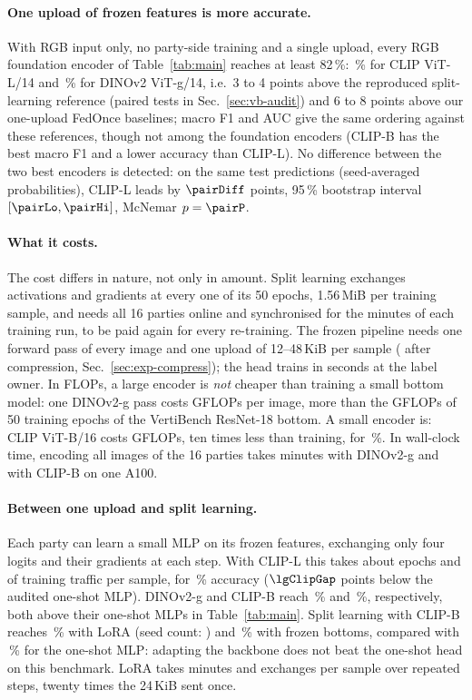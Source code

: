 \paragraph{One upload of frozen features is more accurate.}
With RGB input only, no party-side training and a single upload, every RGB foundation encoder of Table~\ref{tab:main} reaches at least 82\,\%: \vbClipAcc\,\% for CLIP ViT-L/14 and \vbGAcc\,\% for DINOv2 ViT-g/14, i.e.\ 3 to 4 points above the reproduced split-learning reference (paired tests in Sec.~\ref{sec:vb-audit}) and 6 to 8 points above our one-upload FedOnce baselines; macro F1 and AUC give the same ordering against these references, though not among the foundation encoders (CLIP-B has the best macro F1 and a lower accuracy than CLIP-L). No difference between the two best encoders is detected: on the same test predictions (seed-averaged probabilities), CLIP-L leads by $\pairDiff$ points, 95\,\% bootstrap interval $[\pairLo, \pairHi]$, McNemar $p=\pairP$.

\paragraph{What it costs.}
The cost differs in nature, not only in amount. Split learning exchanges activations and gradients at every one of its 50 epochs, 1.56\,MiB per training sample, and needs all 16 parties online and synchronised for the \reproMin{} minutes of each training run, to be paid again for every re-training. The frozen pipeline needs one forward pass of every image and one upload of 12--48\,KiB per sample (\selTwoBytes{} after compression, Sec.~\ref{sec:exp-compress}); the head trains in seconds at the label owner. In FLOPs, a large encoder is \emph{not} cheaper than training a small bottom model: one DINOv2-g pass costs \vbGGF{} GFLOPs per image, more than the \rEighteenTrainGF{} GFLOPs of 50 training epochs of the VertiBench ResNet-18 bottom. A small encoder is: CLIP ViT-B/16 costs \vbClipBGF{} GFLOPs, ten times less than training, for \vbClipBAcc\,\%. In wall-clock time, encoding all images of the 16 parties takes \vbGMin{} minutes with DINOv2-g and \vbClipBMin{} with CLIP-B on one A100.

\paragraph{Between one upload and split learning.}
Each party can learn a small MLP on its frozen features, exchanging only four logits and their gradients at each step. With CLIP-L this takes about \lgClipEp{} epochs and \lgClipUp{} of training traffic per sample, for \lgClipAcc\,\% accuracy ($\lgClipGap$ points below the audited one-shot MLP). DINOv2-g and CLIP-B reach \lgGAcc\,\% and \lgClipBAcc\,\%, respectively, both above their one-shot MLPs in Table~\ref{tab:main}. Split learning with CLIP-B reaches \vbSplitLoraAcc\,\% with LoRA (seed count: \vbSplitLoraN) and \vbSplitFrozenAcc\,\% with frozen bottoms, compared with \vbClipBAcc\,\% for the one-shot MLP: adapting the backbone does not beat the one-shot head on this benchmark. LoRA takes \vbSplitLoraMin{} minutes and exchanges \vbSplitLoraUp{} per sample over repeated steps, twenty times the 24\,KiB sent once.

